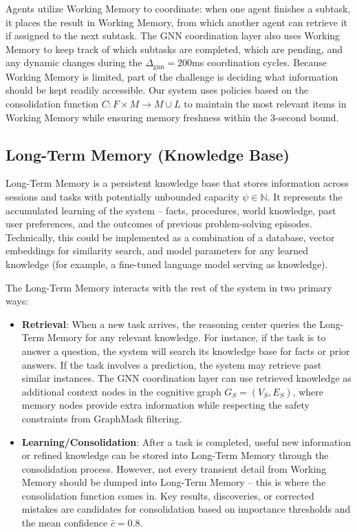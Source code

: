 \documentclass{article}
\begin{document}
Agents utilize Working Memory to coordinate: when one agent finishes a subtask, it places the result in Working Memory, from which another agent can retrieve it if assigned to the next subtask. The GNN coordination layer also uses Working Memory to keep track of which subtasks are completed, which are pending, and any dynamic changes during the $\Delta_{\text{gnn}} = 200$ms coordination cycles. Because Working Memory is limited, part of the challenge is deciding what information should be kept readily accessible. Our system uses policies based on the consolidation function $C: F \times M \rightarrow M \cup L$ to maintain the most relevant items in Working Memory while ensuring memory freshness within the 3-second bound.

\subsection{Long-Term Memory (Knowledge Base)}

Long-Term Memory is a persistent knowledge base that stores information across sessions and tasks with potentially unbounded capacity $\psi \in \mathbb{N}$. It represents the accumulated learning of the system – facts, procedures, world knowledge, past user preferences, and the outcomes of previous problem-solving episodes. Technically, this could be implemented as a combination of a database, vector embeddings for similarity search, and model parameters for any learned knowledge (for example, a fine-tuned language model serving as knowledge).

The Long-Term Memory interacts with the rest of the system in two primary ways:
\begin{itemize}
\item \textbf{Retrieval}: When a new task arrives, the reasoning center queries the Long-Term Memory for any relevant knowledge. For instance, if the task is to answer a question, the system will search its knowledge base for facts or prior answers. If the task involves a prediction, the system may retrieve past similar instances. The GNN coordination layer can use retrieved knowledge as additional context nodes in the cognitive graph $G_S = (V_S, E_S)$, where memory nodes provide extra information while respecting the safety constraints from GraphMask filtering.

\item \textbf{Learning/Consolidation}: After a task is completed, useful new information or refined knowledge can be stored into Long-Term Memory through the consolidation process. However, not every transient detail from Working Memory should be dumped into Long-Term Memory – this is where the consolidation function comes in. Key results, discoveries, or corrected mistakes are candidates for consolidation based on importance thresholds and the mean confidence $\bar{c} = 0.8$.
\end{itemize}
\end{document}
